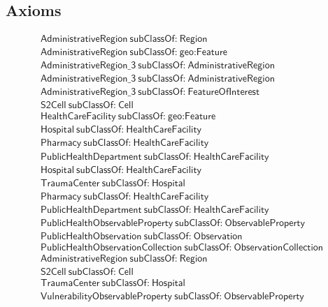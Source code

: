 \subsection{Axioms}
\begin{align}
  \textsf{AdministrativeRegion}~\textsf{subClassOf:}~\textsf{Region}\\
  \textsf{AdministrativeRegion}~\textsf{subClassOf:}~\textsf{geo:Feature}\\
  \textsf{AdministrativeRegion\_3}~\textsf{subClassOf:}~\textsf{AdministrativeRegion}\\
  \textsf{AdministrativeRegion\_3}~\textsf{subClassOf:}~\textsf{AdministrativeRegion}\\
  \textsf{AdministrativeRegion\_3}~\textsf{subClassOf:}~\textsf{FeatureOfInterest}\\
  \textsf{S2Cell}~\textsf{subClassOf:}~\textsf{Cell}\\
  \textsf{HealthCareFacility}~\textsf{subClassOf:}~\textsf{geo:Feature}\\
  \textsf{Hospital}~\textsf{subClassOf:}~\textsf{HealthCareFacility}\\
  \textsf{Pharmacy}~\textsf{subClassOf:}~\textsf{HealthCareFacility}\\
  \textsf{PublicHealthDepartment}~\textsf{subClassOf:}~\textsf{HealthCareFacility}\\
  \textsf{Hospital}~\textsf{subClassOf:}~\textsf{HealthCareFacility}\\
  \textsf{TraumaCenter}~\textsf{subClassOf:}~\textsf{Hospital}\\
  \textsf{Pharmacy}~\textsf{subClassOf:}~\textsf{HealthCareFacility}\\
  \textsf{PublicHealthDepartment}~\textsf{subClassOf:}~\textsf{HealthCareFacility}\\
  \textsf{PublicHealthObservableProperty}~\textsf{subClassOf:}~\textsf{ObservableProperty}\\
  \textsf{PublicHealthObservation}~\textsf{subClassOf:}~\textsf{Observation}\\
  \textsf{PublicHealthObservationCollection}~\textsf{subClassOf:}~\textsf{ObservationCollection}\\
  \textsf{AdministrativeRegion}~\textsf{subClassOf:}~\textsf{Region}\\
  \textsf{S2Cell}~\textsf{subClassOf:}~\textsf{Cell}\\
  \textsf{TraumaCenter}~\textsf{subClassOf:}~\textsf{Hospital}\\
  \textsf{VulnerabilityObservableProperty}~\textsf{subClassOf:}~\textsf{ObservableProperty}\\

\end{align}
